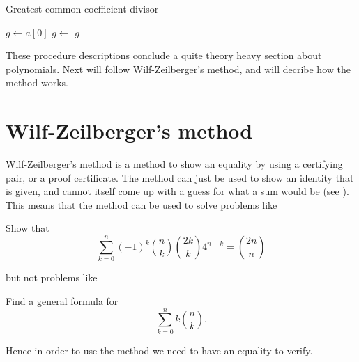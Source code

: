 \begin{algorithm}[H]
  \caption{Greatest common coefficient divisor}
  \begin{algorithmic}[1]
      \State $g\gets a[0]$
        \State $g\gets$ 
      \EndFor
      \State \Return $g$
    \EndProcedure
  \end{algorithmic}
\end{algorithm}
These procedure descriptions conclude a quite theory heavy section about polynomials. Next will follow Wilf-Zeilberger's method, and will decribe how the method works.

\section{Wilf-Zeilberger's method}
Wilf-Zeilberger's method is a method to show an equality by using a certifying pair, or a proof certificate. The method can just be used to show an identity that is given, and cannot itself come up with a guess for what a sum would be (see ). This means that the method can be used to solve problems like
\begin{example}
  Show that $$\sum_{k=0}^n (-1)^k\binom{n}{k}\binom{2k}{k}4^{n-k}=\binom{2n}{n}$$
\end{example}
but not problems like
\begin{example}
  Find a general formula for $$\sum_{k=0}^n k\binom{n}{k}.$$
\end{example}
Hence in order to use the method we need to have an equality to verify.

